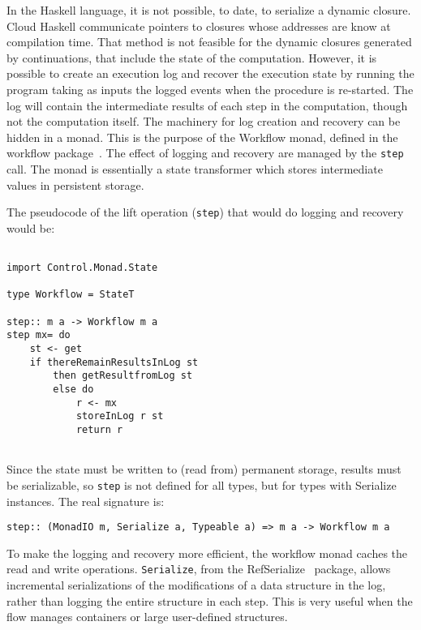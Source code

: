 \documentclass{tmr}
\begin{document}
In the Haskell language, it is not possible, to date, to serialize a dynamic closure. Cloud Haskell \cite{auth:static} communicate pointers to closures whose addresses are know at compilation time. That method is not feasible for the dynamic closures generated by continuations, that include the state of the computation. However, it is possible to create an execution log and recover the execution state by running the program taking as inputs the logged events when the procedure is re-started. The log will contain the intermediate results of each step in the computation, though not the computation itself. The machinery for log creation and recovery can be hidden in a monad. This is the purpose of the Workflow monad, defined in the workflow package~\cite{auth:workflow}. The effect of logging and recovery are managed by the {\tt step} call. The monad is essentially a state transformer which stores intermediate values in persistent storage. 
 
The pseudocode of the lift operation ({\tt step}) that would do 
logging and recovery would be: 
 
{\tt 
 
\begin{verbatim} 
 
import Control.Monad.State 
 
type Workflow = StateT 
 
step:: m a -> Workflow m a 
step mx= do 
    st <- get 
    if thereRemainResultsInLog st 
        then getResultfromLog st 
        else do 
            r <- mx 
            storeInLog r st 
            return r 
 
\end{verbatim} 
 
} 
 
Since the  state must be written to (read from) permanent storage, results must be serializable, so {\tt step} is not defined for all types, but for types with Serialize instances. The real signature is: 
 
{\tt 
 
\begin{verbatim} 
step:: (MonadIO m, Serialize a, Typeable a) => m a -> Workflow m a 
\end{verbatim} 
 
} 
 
 
To make the logging and recovery more efficient, the workflow monad caches the read and write operations.  {\tt Serialize}, from the RefSerialize~\cite{auth:refserialize} package, allows incremental serializations of the modifications of a data structure in the log, rather than logging the entire structure in each step. This is very useful when the flow manages containers or large user-defined structures.
 
\end{document}
